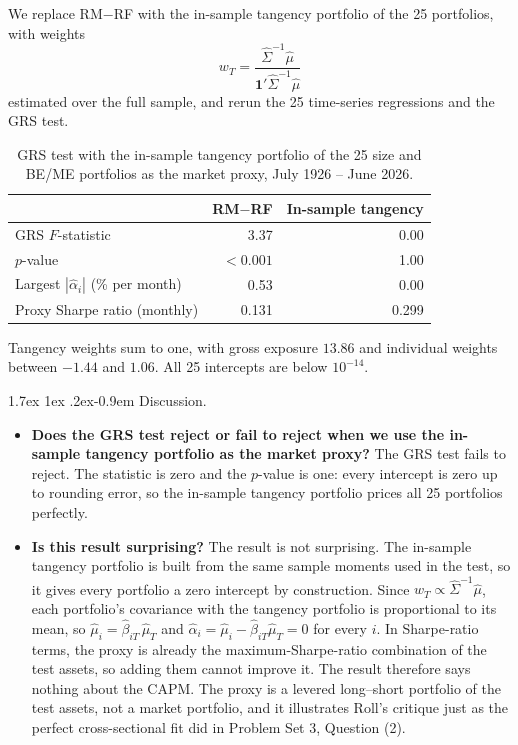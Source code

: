 \documentclass[11pt]{article}
\makeatletter
\renewcommand\paragraph{\@startsection{paragraph}{4}{0pt}%
  {1.7ex \@plus 1ex \@minus .2ex}{-0.9em}%
  {\normalfont\bfseries\normalsize\color{psink}}}
\makeatother
\begin{document}
We replace RM$-$RF with the in-sample tangency portfolio of the 25
portfolios, with weights
\[
w_T = \frac{\hat\Sigma^{-1}\hat\mu}{\mathbf{1}'\hat\Sigma^{-1}\hat\mu}
\]
estimated over the full sample, and rerun the 25 time-series regressions and
the GRS test.

\begin{table}[H]
\centering
\caption{GRS test with the in-sample tangency portfolio of the 25 size and
BE/ME portfolios as the market proxy, July 1926 -- June 2026.}
\small
\begin{tabular}{lrr}
\toprule
& RM$-$RF & In-sample tangency \\
\midrule
GRS $F$-statistic & 3.37 & 0.00 \\
$p$-value & $<0.001$ & 1.00 \\
Largest $|\hat\alpha_i|$ (\% per month) & 0.53 & 0.00 \\
Proxy Sharpe ratio (monthly) & 0.131 & 0.299 \\
\bottomrule
\end{tabular}
\label{tab:p3g}
\vspace{2pt}\begin{minipage}{0.93\textwidth}\footnotesize
Tangency weights sum to one, with gross exposure $13.86$ and individual
weights between $-1.44$ and $1.06$. All 25 intercepts are below $10^{-14}$.
\end{minipage}
\end{table}

\paragraph{Discussion.}
\begin{itemize}
\setlength{\itemsep}{4pt}\setlength{\parskip}{0pt}

\item \textbf{Does the GRS test reject or fail to reject when we use the
in-sample tangency portfolio as the market proxy?} The GRS test fails to
reject. The statistic is zero and the
$p$-value is one: every intercept is zero up to rounding error, so the
in-sample tangency portfolio prices all 25 portfolios perfectly.

\item \textbf{Is this result surprising?} The result is not surprising.
The in-sample tangency portfolio is built from the same sample moments used
in the test, so it gives every portfolio a zero intercept by construction.
Since $w_T \propto \hat\Sigma^{-1}\hat\mu$, each portfolio's covariance with
the tangency portfolio is proportional to its mean, so
$\hat\mu_i = \hat\beta_{iT}\,\hat\mu_T$ and
$\hat\alpha_i = \hat\mu_i - \hat\beta_{iT}\hat\mu_T = 0$ for every $i$. In Sharpe-ratio terms, the proxy is already the
maximum-Sharpe-ratio combination of the test assets, so adding them cannot
improve it. The result therefore says nothing about the CAPM. The proxy is a
levered long--short portfolio of the test assets, not a market portfolio,
and it illustrates Roll's critique just as the perfect cross-sectional fit
did in Problem Set 3, Question (2).

\end{itemize}
\end{document}
